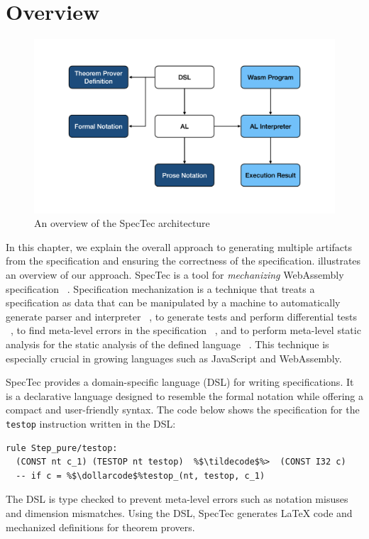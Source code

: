 
\chapter{Overview}
\label{ch:overview}
\noindent


\begin{figure}[t]
  \centerline{\includegraphics[width=15cm]{fig/overview}}
  \caption[An overview of the SpecTec architecture]
    {An overview of the SpecTec architecture}
    \label{fig:overview}
\end{figure}

In this chapter, we explain the overall approach to generating multiple
artifacts from the specification and ensuring the correctness of the
specification.
 illustrates an overview of our approach.
SpecTec is a tool for \textit{mechanizing} WebAssembly specification
~\cite{spectec}.
Specification mechanization is a technique that treats a specification as data
that can be manipulated by a machine to automatically generate parser and
interpreter ~\cite{jiset}, to generate tests and perform differential tests
~\cite{jest}, to find meta-level errors in the specification ~\cite{jstar}, and
to perform meta-level static analysis for the static analysis of the defined
language ~\cite{jsaver}.
This technique is especially crucial in growing languages such as JavaScript
and WebAssembly.


SpecTec provides a domain-specific language (DSL) for writing specifications.
It is a declarative language designed to resemble the formal notation while
offering a compact and user-friendly syntax.
The code below shows the specification for the \texttt{testop} instruction
written in the DSL:
\begin{lstlisting}[escapechar=\%]
  rule Step_pure/testop:
  (CONST nt c_1) (TESTOP nt testop)  %$\tildecode$%>  (CONST I32 c)
  -- if c = %$\dollarcode$%testop_(nt, testop, c_1)
\end{lstlisting}
The DSL is type checked to prevent meta-level errors such as notation misuses and
dimension mismatches.
Using the DSL, SpecTec generates LaTeX code and mechanized definitions for theorem provers.


